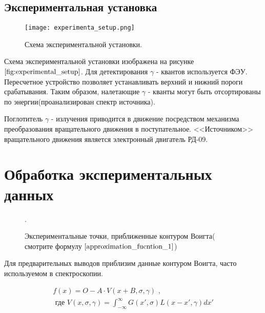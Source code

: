 \documentclass[a4paper, 14pt]{article}
\begin{document}
\subsection*{\textcolor{sub_header}{Экспериментальная установка}}

\begin{figure}[hbtp]
    \begin{center}
        \texttt{[image: experimenta\_setup.png]}
        \caption{Схема экспериментальной установки.}
        \label{fig:experimental_setup}
    \end{center}
\end{figure}

Схема экспериментальной установки изображена на рисунке $\ref{fig:experimental_setup}$.
Для детектирования $\gamma$ - квантов используется ФЭУ. Пересчетное устройство позволяет
устанавливать верхний и нижний пороги срабатывания. Таким образом, налетающие $\gamma$ - кванты
могут быть отсортированы по энергии(проанализирован спектр источника).

Поглотитель $\gamma$ - излучения приводится в движение посредством механизма преобразования
вращательного движения в поступательное. <<Источником>> вращательного движения является
электронный двигатель РД-09.






\section*{\textcolor{header}{Обработка экспериментальных данных}}

\begin{figure}[h]
    \begin{center}
        
    \end{center}
    \caption{Экспериментальные точки, приближенные контуром Воигта( смотрите формулу $\ref{approximation_fucntion_1}$)}.
    \label{fig:raw_data}
\end{figure}

Для предварительных выводов приблизим данные контуром Воигта, часто
используемом в спектроскопии.

\begin{equation}
    \begin{aligned}
        f(x) = O - A \cdot V(x + B, \sigma, \gamma) \text{ ,} \\
        \text{ где } V(x, \sigma, \gamma) = \int_{- \infty}^{\infty} G(x', \sigma) L(x - x', \gamma) dx'
    \end{aligned}
    \label{approximation_fucntion_1}
\end{equation}
\end{document}
